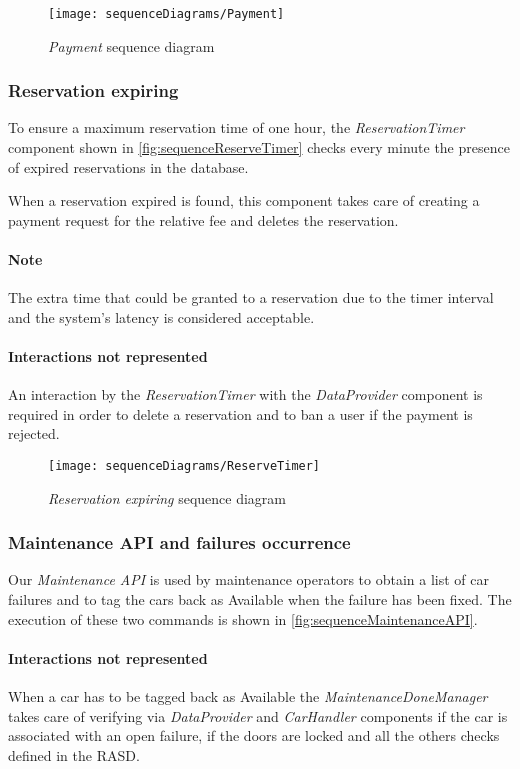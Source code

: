 \begin{figure}[h!]
	\centering
	\texttt{[image: sequenceDiagrams/Payment]}
	\caption{
		\label{fig:sequencePayment} 
		\emph{Payment} sequence diagram
	}
\end{figure}

\clearpage
\subsubsection{Reservation expiring}
To ensure a maximum reservation time of one hour, the \emph{ReservationTimer} component shown in \autoref{fig:sequenceReserveTimer} checks every minute the presence of expired reservations in the database. 

When a reservation expired is found, this component takes care of creating a payment request for the relative fee and deletes the reservation. 

\paragraph{Note}The extra time that could be granted to a reservation due to the timer interval and the system's latency is considered acceptable.

\paragraph{Interactions not represented} An interaction by the \emph{ReservationTimer} with the \emph{DataProvider} component is required in order to delete a reservation and to ban a user if the payment is rejected.
\begin{figure}[h!]
	\centering
	\texttt{[image: sequenceDiagrams/ReserveTimer]}
	\caption{
		\label{fig:sequenceReserveTimer} 
		\emph{Reservation expiring} sequence diagram
	}
\end{figure}

\clearpage
\subsubsection{Maintenance API and failures occurrence}
Our \emph{Maintenance API} is used by maintenance operators to obtain a list of car failures and to tag the cars back as Available when the failure has been fixed. The execution of these two commands is shown in \autoref{fig:sequenceMaintenanceAPI}.
\paragraph{Interactions not represented}When a car has to be tagged back as \mbox{Available} the \emph{MaintenanceDoneManager} takes care of verifying via \emph{DataProvider} and \emph{CarHandler} components if the car is associated with an open failure, if the doors are locked and all the others checks defined in the RASD.

